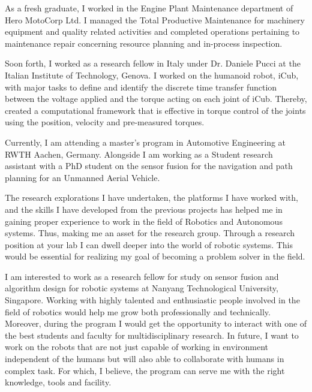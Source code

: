 \documentclass{letter} %
\begin{document}
\begin{letter}
As a fresh graduate, I worked in the Engine Plant Maintenance department of Hero MotoCorp Ltd. I managed the Total Productive Maintenance for machinery equipment and quality related activities and completed operations pertaining to maintenance repair concerning resource planning and in-process inspection. 

Soon forth, I worked as a research fellow in Italy under Dr. Daniele Pucci at the Italian Institute of Technology, Genova. I worked on the humanoid robot, iCub, with major tasks to define and identify the discrete time transfer function between the voltage applied and the torque acting on each joint of iCub. Thereby, created a computational framework that is effective in torque control of the joints using the position, velocity and pre-measured torques.

Currently, I am attending a master's program in Automotive Engineering at RWTH Aachen, Germany. Alongside I am working as a Student research assistant with a PhD student on the sensor fusion for the navigation and path planning for an Unmanned Aerial Vehicle.


The research explorations I have undertaken, the platforms I have worked with, and the skills I have developed from the previous projects has helped me in gaining proper experience to work in the field of Robotics and Autonomous systems. Thus, making me an asset for the research group. Through a research position at your lab I can dwell deeper into the world of robotic systems. This would be essential for realizing my goal of becoming a problem solver in the field.

I am interested to work as a research fellow for study on sensor fusion and algorithm design for robotic systems at  Nanyang Technological University, Singapore. Working with highly talented and enthusiastic people involved in the field of robotics would help me grow both professionally and technically. Moreover, during the program I would get the opportunity to interact with one of the best students and faculty for multidisciplinary research. In future, I want to work on the robots that are not just capable of working in environment independent of the humans but will also able to collaborate with humans in complex task. For which, I believe, the program can serve me with the right knowledge, tools and facility.


\end{letter}
\end{document}

